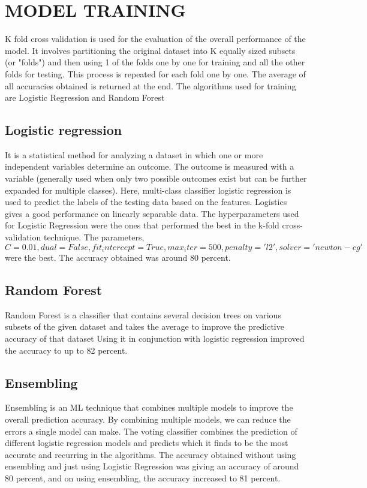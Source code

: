 \documentclass[conference]{IEEEtran}
\begin{document}
\section{MODEL TRAINING}

K fold cross validation is used for the evaluation of the overall performance of the model. It involves partitioning the original dataset into K equally sized subsets (or "folds") and then using 1 of the folds one by one for training and all the other folds for testing. This process is repeated for each fold one by one. The average of all accuracies obtained is returned at the end.
The algorithms used for training are Logistic Regression and Random Forest

\subsection{Logistic regression}
It is a statistical method for analyzing a dataset in which one or more independent variables determine an outcome. The outcome is measured with a variable (generally used when only two possible outcomes exist but can be further expanded for multiple classes). Here, multi-class classifier logistic regression is used to predict the labels of the testing data based on the features. Logistics gives a good performance on linearly separable data.
The hyperparameters used for Logistic Regression were the ones that performed the best in the k-fold cross-validation technique. The parameters, $C= 0.01, dual= False, fit_intercept= True, max_iter= 500, penalty= 'l2', solver= 'newton-cg'$ were the best.
The accuracy obtained was around 80 percent.

\subsection{Random Forest }
Random Forest is a classifier that contains several decision trees on various subsets of the given dataset and takes the average to improve the predictive accuracy of that dataset
Using it in conjunction with logistic regression improved the accuracy to up to 82 percent.

\subsection{Ensembling}
Ensembling is an ML technique that combines multiple models to improve the overall prediction accuracy. By combining multiple models, we can reduce the errors a single model can make. The voting classifier combines the prediction of different logistic regression models and predicts which it finds to be the most accurate and recurring in the algorithms.
The accuracy obtained without using ensembling and just using Logistic Regression was giving an accuracy of around 80 percent, and on using ensembling, the accuracy increased to 81 percent. 
\end{document}
